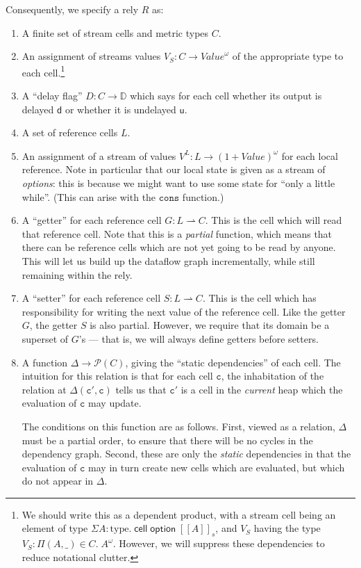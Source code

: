 \documentclass[preprint]{sigplanconf}
\newcommand{\term}[1]{\ensuremath{\mathtt{{#1}}}}
\newcommand{\interps}[1]{[\![{#1}]\!]_s}
\newcommand{\celltype}[1]{\mathsf{cell}\;{#1}}
\newcommand{\opttype}[1]{\mathsf{option}\;{#1}}
\newcommand{\powerset}[1]{\mathcal{P}(#1)}
\newcommand{\Delays}{\mathbb{D}}
\newcommand{\U}{\mathsf{u}}
\newcommand{\D}{\mathsf{d}}
\begin{document}
Consequently, we specify a rely $R$ as:
\begin{enumerate}
\item A finite set of stream cells and metric types $C$. 
\item An assignment of streams values $V_S : C \to \mathit{Value}^\omega$ 
  of the appropriate type to each cell.\footnote{We should write this 
  as a dependent product, with a stream cell being an element of type 
  $\Sigma A:\mathrm{type}.\;\celltype{\opttype{\interps{A}}}$, and $V_S$ having
  the type $V_S : \Pi (A, \_) \in C.\; A^\omega$. However, we will suppress these 
  dependencies to reduce notational clutter.}
\item A ``delay flag'' $D : C \to \Delays$ which says for each cell whether 
  its output is delayed $\D$ or whether it is undelayed $\U$. 
\item A set of reference cells $L$. 
\item An assignment of a stream of values $V^L : L \to \mathit{(1 +
  \mathit{Value})^\omega}$ for each local reference. Note in
  particular that our local state is given as a stream of
  \emph{options}: this is because we might want to use some state for
  ``only a little while''. (This can arise with the \term{cons}
  function.)
\item A ``getter'' for each reference cell $G : L \rightharpoonup
  C$. This is the cell which will read that reference cell. Note that
  this is a \emph{partial} function, which means that there can be
  reference cells which are not yet going to be read by anyone. This
  will let us build up the dataflow graph incrementally, while still
  remaining within the rely. 
\item A ``setter'' for each reference cell $S : L \rightharpoonup
  C$. This is the cell which has responsibility for writing the next
  value of the reference cell. Like the getter $G$, the getter $S$ is
  also partial. However, we require that its domain be a superset of $G$'s ---
  that is, we will always define getters before setters. 

\item A function $\Delta \to \powerset{C}$, giving the
  ``static dependencies'' of each cell. The intuition for this
  relation is that for each cell \term{c}, the inhabitation of the
  relation at $\Delta(\term{c'},\term{c})$ tells us that \term{c'} is
  a cell in the \emph{current} heap which the evaluation of \term{c} may
  update. 

  The conditions on this function are as follows. First, viewed as a
  relation, $\Delta$ must be a partial order, to ensure that there
  will be no cycles in the dependency graph. Second, these are only
  the \emph{static} dependencies in that the evaluation of \term{c}
  may in turn create new cells which are evaluated, but which do not
  appear in $\Delta$. 
\end{enumerate}
\end{document}
